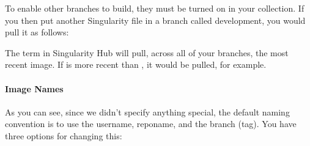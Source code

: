\documentclass[letterpaper,10pt,english]{sphinxmanual}
\begin{document}
To enable other branches to build, they must be turned on in your
collection. If you then put another Singularity file in a branch called development,
you would pull it as follows:

%
\begin{sphinxVerbatim}[commandchars=\\\{\}]
  
\end{sphinxVerbatim}

The term  in Singularity Hub will pull, across all of your
branches, the most recent image. If  is more recent than
, it would be pulled, for example.


\paragraph{Image Names}
\label{\detokenize{appendix:image-names}}
As you can see, since we didn’t specify anything special, the default
naming convention is to use the username, reponame, and the branch
(tag). You have three options for changing this:

%
\begin{sphinxVerbatim}[commandchars=\\\{\}]
 

             

            

              
\end{sphinxVerbatim}
\end{document}

